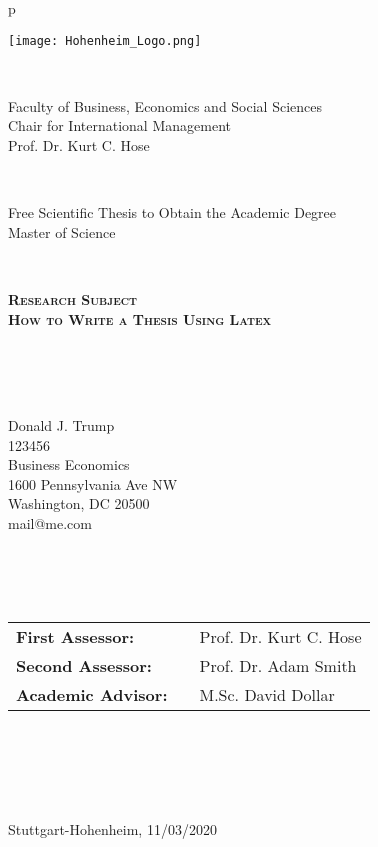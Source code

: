 \documentclass[11pt,a4paper,oneside]{report}
\begin{document}
\begin{center}
\begin{tabular}{p{\textwidth}}
\thispagestyle{empty}
\\
\begin{center}
\texttt{[image: Hohenheim\_Logo.png]}
\end{center}
\\
\begin{center}
\large{Faculty of Business, Economics and Social Sciences \\
Chair for International Management \\
Prof. Dr. Kurt C. Hose}
\end{center}
\\
\begin{center}
Free Scientific Thesis to Obtain the Academic Degree\\
Master of Science
\end{center}
\\
\begin{center}
\textbf{\LARGE{\textsc{
Research Subject \\
How to  Write a Thesis Using Latex \\}
}}
\end{center}
\\
\\
\\
\begin{center}
Donald J. Trump\\
123456\\
Business Economics\\
1600 Pennsylvania Ave NW \\
Washington, DC 20500\\
mail@me.com\\
\end{center}
\\
\\
\\
\begin{center}
\begin{tabular}{lll}
\textbf{First Assessor:} & & Prof. Dr. Kurt C. Hose\\
\textbf{Second Assessor:}& & Prof. Dr. Adam Smith\\
\textbf{Academic Advisor:} & & M.Sc. David Dollar\\
\end{tabular}
\end{center}
\\
\\
\\
\\
\begin{center}
Stuttgart-Hohenheim, 11/03/2020
\end{center}
\end{tabular}
\end{center}
\end{document}

